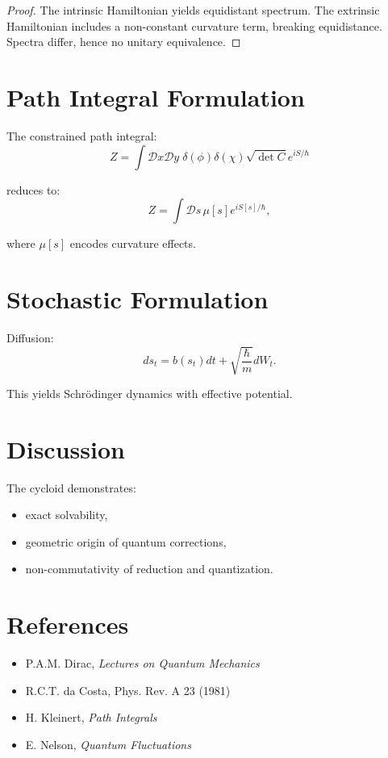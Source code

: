 \documentclass[11pt]{article}
\begin{document}
\begin{proof}
The intrinsic Hamiltonian yields equidistant spectrum. The extrinsic Hamiltonian includes a non-constant curvature term, breaking equidistance. Spectra differ, hence no unitary equivalence.
\end{proof}

\section{Path Integral Formulation}

The constrained path integral:
\begin{equation}
Z = \int \mathcal{D}x\mathcal{D}y\;
\delta(\phi)\delta(\chi)\sqrt{\det C}
e^{iS/\hbar}
\end{equation}

reduces to:
\begin{equation}
Z = \int \mathcal{D}s\,\mu[s] e^{iS[s]/\hbar},
\end{equation}

where $\mu[s]$ encodes curvature effects.

\section{Stochastic Formulation}

Diffusion:
\begin{equation}
ds_t = b(s_t)dt + \sqrt{\frac{\hbar}{m}} dW_t.
\end{equation}

This yields Schrödinger dynamics with effective potential.

\section{Discussion}

The cycloid demonstrates:
\begin{itemize}
\item exact solvability,
\item geometric origin of quantum corrections,
\item non-commutativity of reduction and quantization.
\end{itemize}

\section*{References}

\begin{itemize}
\item P.A.M. Dirac, \textit{Lectures on Quantum Mechanics}
\item R.C.T. da Costa, Phys. Rev. A 23 (1981)
\item H. Kleinert, \textit{Path Integrals}
\item E. Nelson, \textit{Quantum Fluctuations}
\end{itemize}
\end{document}
